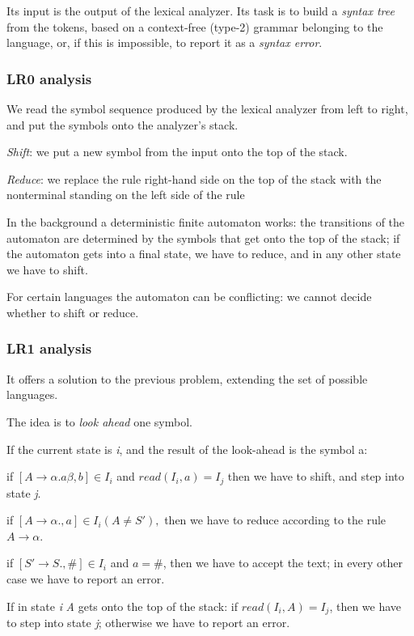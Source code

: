 \documentclass[margin=0px]{article}
\begin{document}
Its input is the output of the lexical analyzer. Its task is to build a \textit{syntax tree} from the tokens, based on a context-free (type-2) grammar belonging to the language, or, if this is impossible, to report it as a \textit{syntax error}.

\subsubsection{LR0 analysis}

We read the symbol sequence produced by the lexical analyzer from left to
right, and put the symbols onto the analyzer's stack.

\textit{Shift}: we put a new symbol from the input onto the top of the
stack.

\textit{Reduce}: we replace the rule right-hand side on the top of the stack
with the nonterminal standing on the left side of the rule

In the background a deterministic finite automaton works:
the transitions of the automaton are determined by the symbols that get onto the top of the stack;
if the automaton gets into a final state, we have to reduce,
and in any other state we have to shift.

For certain languages the automaton can be conflicting: we cannot decide whether to shift or reduce.

\subsubsection{LR1 analysis}

It offers a solution to the previous problem, extending the set of possible languages.

The idea is to \textit{look ahead} one symbol.

If the current state is \textit{i}, and the result of the look-ahead is the
symbol a:

if $ [A	\rightarrow \alpha.a\beta, b] \in I_i $ and $read(I_i, a) = I_j$
then we have to shift, and step into state \textit{j}.


if $ [A	\rightarrow \alpha., a] \in I_i (A \neq S'), $
then we have to reduce according to the rule $ A \rightarrow \alpha $.




if $ [S' \rightarrow S., \#] \in I_i $ and $ a = \# $, then we have to accept the text;	in every other case we have to report an error.

If in state \textit{i} \textit{A} gets onto the top of the stack:
if $  read(I_i,A) =	I_j $,
then we have to step into state \textit{j};	otherwise we have to report an error.
\end{document}
